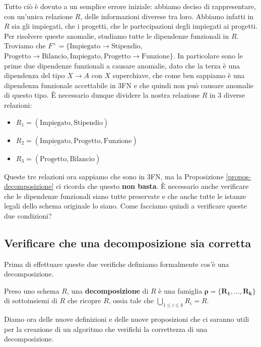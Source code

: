\documentclass[11pt, a4paper, titlepage, oneside]{scrbook}
\begin{document}
Tutto ciò è dovuto a un semplice errore iniziale: abbiamo deciso di rappresentare, con un'unica relazione $R$, delle informazioni diverese tra loro. Abbiamo infatti in $R$ sia gli impiegati, che i progetti, che le partecipazioni degli impiegati ai progetti. Per risolvere queste anomalie, studiamo tutte le dipendenze funzionali in $R$. Troviamo che $F^+ = \{\text{Impiegato} \longrightarrow \text{Stipendio},$ \mbox{$\text{Progetto} \longrightarrow \text{Bilancio}, \text{Impiegato}, \text{Progetto} \longrightarrow \text{Funzione}\}$}. In particolare sono le prime due dipendenze funzionali a causare anomalie, dato che la terza è una dipendenza del tipo $X \longrightarrow A$ con $X$ superchiave, che come ben sappiamo è una dipendenza funzionale accettabile in 3FN e che quindi non può causare anomalie di questo tipo. È necessario dunque dividere la nostra relazione $R$ in 3 diverse relazioni:
\begin{itemize}
    \item $R_1 = (\underline{\text{Impiegato}}, \text{Stipendio})$
    \item $R_2 = (\underline{\text{Impiegato}}, \underline{\text{Progetto}}, \text{Funzione})$
    \item $R_3 = (\underline{\text{Progetto}}, \text{Bilancio})$ 
\end{itemize}

Queste tre relazioni ora sappiamo che sono in 3FN, ma la Proposizione \ref{propos-decomposizione} ci ricorda che questo \textbf{non basta}. È necessario anche verificare che le dipendenze funzionali siano tutte preservate e che anche tutte le istanze legali dello schema originale lo siano. Come facciamo quindi a verificare queste due condizioni? 

\subsection{Verificare che una decomposizione sia corretta}

Prima di effettuare queste due verifiche definiamo formalmente cos'è una decomposizione.

\begin{Definizione}[Decomposizione]
\label{def-decomposizione}
Preso uno schema $R$, una \textbf{decomposizione} di $R$ è una famiglia $\bm{\rho = \{R_1, \ldots, R_k\}}$ di sottoinsiemi di $R$ che ricopre $R$, ossia tale che $\bigcup_{1 \leq i \leq k} R_i = R$.
\end{Definizione}

Diamo ora delle nuove definizioni e delle nuove proposizioni che ci saranno utili per la creazione di un algoritmo che verifichi la correttezza di una decomposizione.
\end{document}
